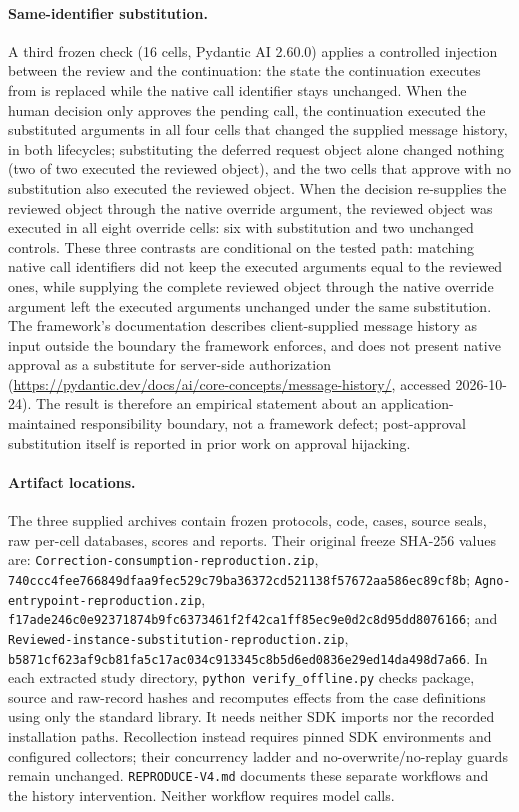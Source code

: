 \paragraph{Same-identifier substitution.}
A third frozen check (16 cells, Pydantic AI 2.60.0) applies a controlled injection
between the review and the continuation: the state the continuation executes from is
replaced while the native call identifier stays unchanged. When the human decision only
approves the pending call, the continuation
executed the substituted arguments in all four cells that changed the supplied message
history, in both lifecycles; substituting the deferred request object alone changed
nothing (two of two executed the reviewed object), and the two cells that approve with no
substitution also executed the reviewed object. When the decision re-supplies the
reviewed object through the native override argument, the reviewed object was executed
in all eight override cells: six with substitution and two unchanged controls. These three contrasts are conditional on the tested path: matching native call
identifiers did not keep the executed arguments equal to the reviewed ones, while
supplying the complete reviewed object through the native override argument left the
executed arguments unchanged under the same substitution. The framework's
documentation describes client-supplied message history as input outside the boundary
the framework enforces, and does not present native approval as a substitute for
server-side authorization
(\url{https://pydantic.dev/docs/ai/core-concepts/message-history/}, accessed
2026-10-24). The result is therefore an empirical statement about an
application-maintained responsibility boundary, not a framework defect; post-approval
substitution itself is reported in prior work on approval hijacking.

\paragraph{Artifact locations.}
The three supplied archives contain frozen protocols, code, cases, source seals,
raw per-cell databases, scores and reports. Their original freeze SHA-256 values are:
\nolinkurl{Correction-consumption-reproduction.zip},
\nolinkurl{740ccc4fee766849dfaa9fec529c79ba36372cd521138f57672aa586ec89cf8b};
\nolinkurl{Agno-entrypoint-reproduction.zip},
\nolinkurl{f17ade246c0e92371874b9fc6373461f2f42ca1ff85ec9e0d2c8d95dd8076166}; and
\nolinkurl{Reviewed-instance-substitution-reproduction.zip},
\nolinkurl{b5871cf623af9cb81fa5c17ac034c913345c8b5d6ed0836e29ed14da498d7a66}.
In each extracted study directory, \texttt{python verify\_offline.py} checks package,
source and raw-record hashes and recomputes effects from the case definitions using
only the standard library. It needs neither SDK imports nor the recorded installation
paths. Recollection instead requires pinned SDK environments and configured collectors;
their concurrency ladder and no-overwrite/no-replay guards remain unchanged.
\texttt{REPRODUCE-V4.md} documents these separate workflows and the history intervention.
Neither workflow requires model calls.
